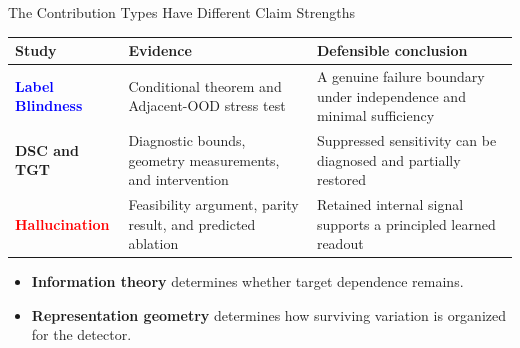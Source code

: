 \documentclass[aspectratio=1610]{beamer}
\begin{document}
\begin{frame}{The Contribution Types Have Different Claim Strengths}
\centering
\small
\renewcommand{\arraystretch}{1.3}
\begin{tabular}{>{\raggedright\arraybackslash}p{2.2cm}>{\raggedright\arraybackslash}p{3.3cm}>{\raggedright\arraybackslash}p{4.0cm}}
\toprule
\textbf{Study} & \textbf{Evidence} & \textbf{Defensible conclusion} \\
\midrule
\textcolor{blue}{\textbf{Label Blindness}} & Conditional theorem and Adjacent-OOD stress test & A genuine failure boundary under independence and minimal sufficiency \\
\textcolor{green!60!black}{\textbf{DSC and TGT}} & Diagnostic bounds, geometry measurements, and intervention & Suppressed sensitivity can be diagnosed and partially restored \\
\textcolor{red}{\textbf{Hallucination}} & Feasibility argument, parity result, and predicted ablation & Retained internal signal supports a principled learned readout \\
\bottomrule
\end{tabular}

\vfill
\begin{itemize}
  \item \textbf{Information theory} determines whether target dependence remains.
  \item \textbf{Representation geometry} determines how surviving variation is organized for the detector.
\end{itemize}
\end{frame}
\end{document}
